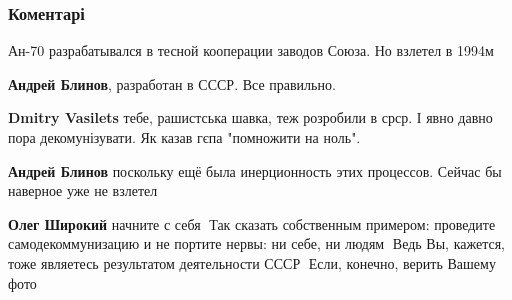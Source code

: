  
 
 
 
 
\subsubsection{Коментарі}

\begin{itemize}


Ан-70 разрабатывался в тесной кооперации заводов Союза. Но взлетел в 1994м

\begin{itemize}

 
\textbf{Андрей Блинов}, разработан в СССР. Все правильно.

 
\textbf{Dmitry Vasilets} тебе, рашистська шавка, теж розробили в срср. І явно давно пора декомунізувати. Як казав гєпа "помножити на ноль".

 
\textbf{Андрей Блинов} поскольку ещё была инерционность этих процессов. Сейчас бы наверное уже не взлетел🤔


\textbf{Олег Широкий} начните с себя🤔 Так сказать собственным примером: проведите самодекоммунизацию и не портите нервы: ни себе, ни людям🤔 Ведь Вы, кажется, тоже являетесь результатом деятельности СССР🤔 Если, конечно, верить Вашему фото🤔
\end{itemize}



\end{itemize}
